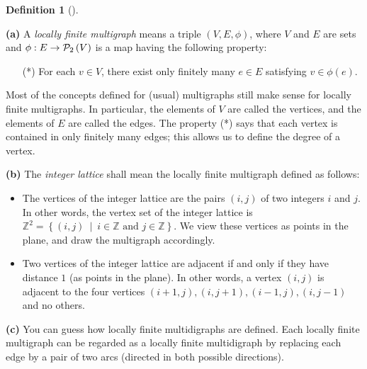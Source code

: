 \documentclass[numbers=enddot,12pt,final,onecolumn,notitlepage]{scrartcl}%
\theoremstyle{definition}
\newtheorem{defi}[theo]{Definition}
\newenvironment{definition}[1][]
{\begin{defi}[#1]\begin{leftbar}}
{\end{leftbar}\end{defi}}
\newcommand{\ZZ}{\mathbb{Z}}
\newcommand{\powset}[2][]{\ifthenelse{\equal{#2}{}}{\mathcal{P}\left(#1\right)}{\mathcal{P}_{#1}\left(#2\right)}}
\newcommand{\set}[1]{\left\{ #1 \right\}}
\newcommand{\tup}[1]{\left( #1 \right)}
\begin{document}
\begin{definition}
\textbf{(a)} A \textit{locally finite multigraph} means
a triple $\tup{V, E, \phi}$, where $V$ and $E$ are sets
and $\phi : E \to \powset[2]{V}$ is a map having the
following property:
\begin{enumerate}
\item[(*)] For each $v \in V$, there exist only finitely
many $e \in E$ satisfying $v \in \phi \tup{e}$.
\end{enumerate}

Most of the concepts defined for (usual) multigraphs still
make sense for locally finite multigraphs.
In particular, the elements of $V$ are called the
vertices, and the elements of $E$ are called the
edges.
The property (*) says that each vertex is contained in
only finitely many edges; this allows us to define
the degree of a vertex.

\textbf{(b)} The \textit{integer lattice} shall mean
the locally finite multigraph defined as follows:
\begin{itemize}
\item The vertices of the integer lattice are the
      pairs $\tup{i, j}$ of two integers $i$ and $j$.
      In other words, the vertex set of the integer
      lattice is
        $\ZZ^2 = \set{ \tup{i, j} \ \mid \ i \in \ZZ
                        \text{ and } j \in \ZZ }$.
      We view these vertices as points in the
      plane, and draw the multigraph accordingly.
\item Two vertices of the integer lattice are
      adjacent if and only if they have distance $1$
      (as points in the plane).
      In other words, a vertex $\tup{i, j}$ is
      adjacent to the four vertices
      $\tup{i+1, j}, \tup{i, j+1}, \tup{i-1, j},
      \tup{i, j-1}$ and no others.
\end{itemize}

\textbf{(c)} You can guess how locally finite
multidigraphs are defined.
Each locally finite multigraph can be regarded as a
locally finite multidigraph by replacing each edge
by a pair of two arcs (directed in both possible
directions).
\end{definition}
\end{document}
